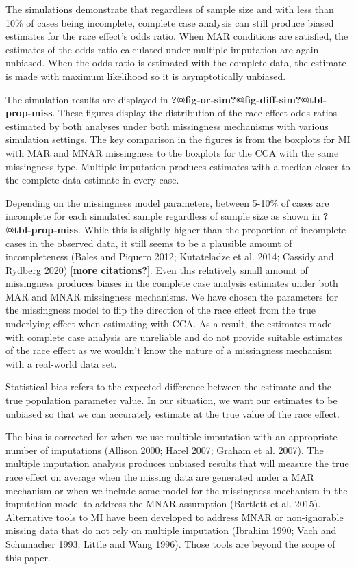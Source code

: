 \documentclass[
  letterpaper,
  DIV=11,
  numbers=noendperiod]{scrartcl}
\begin{document}
The simulations demonstrate that regardless of sample size and with less
than 10\% of cases being incomplete, complete case analysis can still
produce biased estimates for the race effect's odds ratio. When MAR
conditions are satisfied, the estimates of the odds ratio calculated
under multiple imputation are again unbiased. When the odds ratio is
estimated with the complete data, the estimate is made with maximum
likelihood so it is asymptotically unbiased.

The simulation results are displayed in
\textbf{?@fig-or-sim}\textbf{?@fig-diff-sim}\textbf{?@tbl-prop-miss}.
These figures display the distribution of the race effect odds ratios
estimated by both analyses under both missingness mechanisms with
various simulation settings. The key comparison in the figures is from
the boxplots for MI with MAR and MNAR missingness to the boxplots for
the CCA with the same missingness type. Multiple imputation produces
estimates with a median closer to the complete data estimate in every
case.

Depending on the missingness model parameters, between 5-10\% of cases
are incomplete for each simulated sample regardless of sample size as
shown in \textbf{?@tbl-prop-miss}. While this is slightly higher than
the proportion of incomplete cases in the observed data, it still seems
to be a plausible amount of incompleteness (Bales and Piquero 2012;
Kutateladze et al. 2014; Cassidy and Rydberg 2020) {[}\textbf{more
citations?}{]}. Even this relatively small amount of missingness
produces biases in the complete case analysis estimates under both MAR
and MNAR missingness mechanisms. We have chosen the parameters for the
missingness model to flip the direction of the race effect from the true
underlying effect when estimating with CCA. As a result, the estimates
made with complete case analysis are unreliable and do not provide
suitable estimates of the race effect as we wouldn't know the nature of
a missingness mechanism with a real-world data set.

Statistical bias refers to the expected difference between the estimate
and the true population parameter value. In our situation, we want our
estimates to be unbiased so that we can accurately estimate at the true
value of the race effect.

The bias is corrected for when we use multiple imputation with an
appropriate number of imputations (Allison 2000; Harel 2007; Graham et
al. 2007). The multiple imputation analysis produces unbiased results
that will measure the true race effect on average when the missing data
are generated under a MAR mechanism or when we include some model for
the missingness mechanism in the imputation model to address the MNAR
assumption (Bartlett et al. 2015). Alternative tools to MI have been
developed to address MNAR or non-ignorable missing data that do not rely
on multiple imputation (Ibrahim 1990; Vach and Schumacher 1993; Little
and Wang 1996). Those tools are beyond the scope of this paper.
\end{document}
